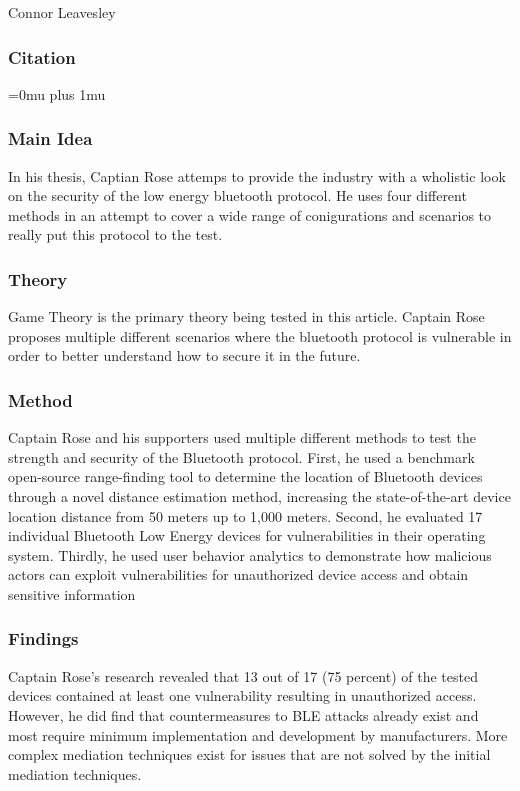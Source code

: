 \noindent
Connor Leavesley

\noindent
\subsubsection{Citation}

\Urlmuskip=0mu plus 1mu\relax
{}

\subsubsection{Main Idea}

\noindent
In his thesis, Captian Rose attemps to provide the industry with a wholistic look on the security of the low energy bluetooth protocol. He uses four different methods in an attempt to cover a wide range of conigurations and scenarios to really put this protocol to the test.

\subsubsection{Theory}

\noindent
Game Theory is the primary theory being tested in this article.  Captain Rose proposes multiple different scenarios where the bluetooth protocol is vulnerable in order to better understand how to secure it in the future.

\subsubsection{Method}

\noindent
Captain Rose and his supporters used multiple different methods to test the strength and security of the Bluetooth protocol. First, he used a benchmark open-source range-finding tool to determine the location of Bluetooth devices through a novel distance estimation method, increasing the state-of-the-art device location distance from 50 meters up to 1,000 meters. Second, he evaluated 17 individual Bluetooth Low Energy devices for vulnerabilities in their operating system. Thirdly, he used user behavior analytics to demonstrate how malicious actors can exploit vulnerabilities for unauthorized device access and obtain sensitive information

\subsubsection{Findings}

\noindent
Captain Rose's research revealed that 13 out of 17 (75 percent) of the tested devices contained at least one vulnerability resulting in unauthorized access. However, he did find that countermeasures to BLE attacks already exist and most require minimum implementation and development by manufacturers. More complex mediation techniques exist for issues that are not solved by the initial mediation techniques.

